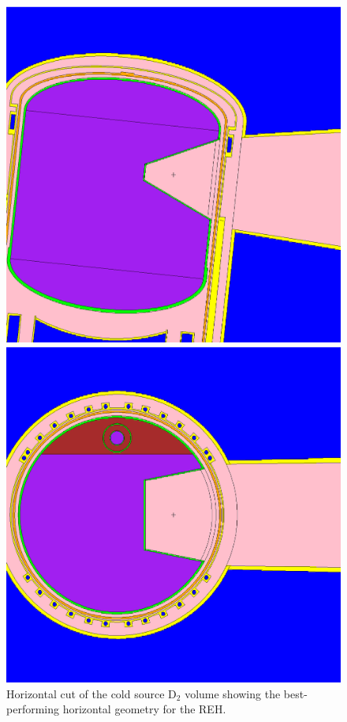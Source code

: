 \documentclass[preprint,12pt]{elsarticle}
\begin{document}
\begin{figure}[h]
\begin{minipage}{11pc}
\begin{center}
\includegraphics[scale=0.4]{graphics/FINALREH_XY.eps}
\end{center}
\caption{\label{case_horiz}Horizontal cut of the cold source D$_2$ volume showing the best-performing horizontal geometry for the REH.}
\end{minipage} \hfill%
\begin{minipage}{11pc}
\begin{center}
\includegraphics[scale=0.4]{graphics/FINALREH_YZ.eps}

\end{center}
\end{minipage}
\end{figure}
\end{document}
